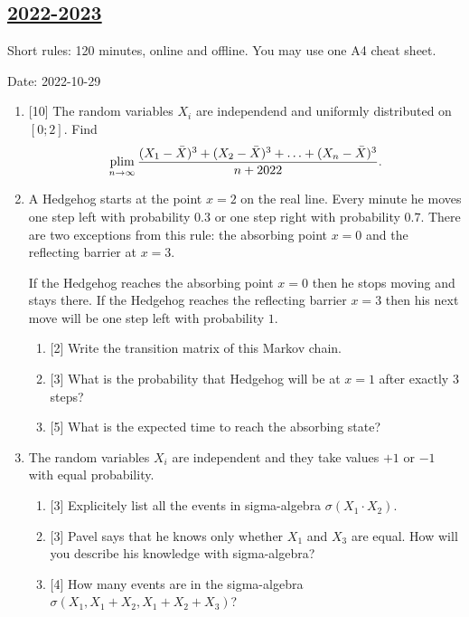 \subsection[2022-2023]{\hyperref[sec:sol_kr_01_2022_2023]{2022-2023}}
\label{sec:kr_01_2022_2023} %

Short rules: 120 minutes, online and offline. You may use one A4 cheat sheet.

Date: 2022-10-29

\begin{enumerate}

  \item %
  {[10]} The random variables $X_i$ are independend and uniformly distributed on $[0;2]$.
  Find 
      \[
      \operatorname*{plim}_{n\to\infty}  \frac{(X_1 - \bar X)^3 + (X_2 - \bar X)^3 + \ldots + (X_n - \bar X)^3}{n + 2022}.
      \]
     
  
  \item A Hedgehog starts at the point $x=2$ on the real line. 
  Every minute he moves one step left with probability $0.3$ or one step right with probability $0.7$.
  There are two exceptions from this rule: the absorbing point $x=0$ and the reflecting barrier at $x=3$.
  
  If the Hedgehog reaches the absorbing point $x=0$ then he stops moving and stays there. 
  If the Hedgehog reaches the reflecting barrier $x=3$ then his next move will be one step left with probability $1$.
  
  \begin{enumerate}
  \item {[2]} Write the transition matrix of this Markov chain. 
  \item {[3]} What is the probability that Hedgehog will be at $x=1$ after exactly 3 steps?
  \item {[5]} What is the expected time to reach the absorbing state?
  \end{enumerate}
  
  
  \item The random variables $X_i$ are independent and they take values $+1$ or $-1$ with equal probability. 
  
  \begin{enumerate}
  \item {[3]} Explicitely list all the events in sigma-algebra $\sigma(X_1 \cdot X_2)$.
  \item {[3]} Pavel says that he knows only whether $X_1$ and $X_3$ are equal. 
  How will you describe his knowledge with sigma-algebra?
  \item {[4]} How many events are in the sigma-algebra $\sigma(X_1, X_1 + X_2, X_1 + X_2 + X_3)$?
  \end{enumerate}
  

\end{enumerate}

